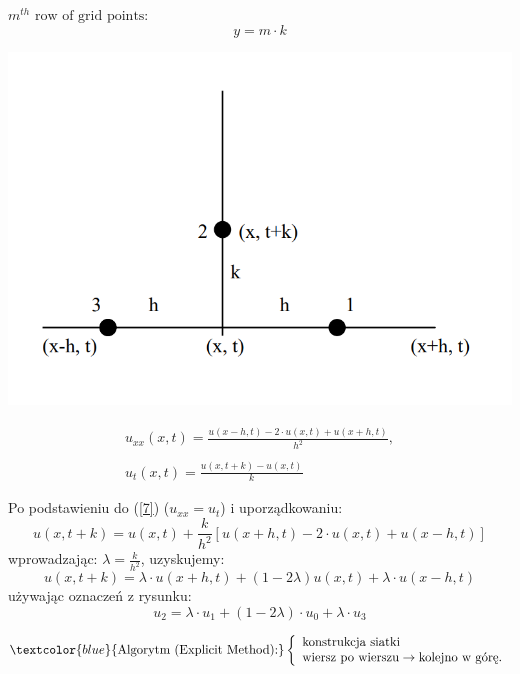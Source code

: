 \begin{frame}
$ m^{th} \text{ row of grid points:}$
$$y = m \cdot k$$
\centerline{\includegraphics[height = 0.55 \textheight]{img/23/stabilnosc2}}

\begin{block}{}
   $$ \begin{array}{l}
   u_{xx}(x,t) = \frac{u(x-h,t)-2 \cdot u(x,t) + u(x+h,t)}{h^{2}}, \\ \\
   u_t (x,t)= \frac{u(x,t+k)-u(x,t)}{k}
   \end{array}$$
 \end{block}

\end{frame}

\begin{frame}
Po podstawieniu do (\ref{7}) ($u_{x x} = u_t$) i uporządkowaniu:
$$u(x,t+k) = u(x,t) + \frac{k}{h^2}[u(x+h,t)-2\cdot u(x,t)+u(x-h,t)]$$
wprowadzając: $\lambda = \frac{k}{h^2}$, uzyskujemy:
$$u(x,t+k) = \lambda \cdot u(x+h,t)+(1-2\lambda)u(x,t)+\lambda \cdot u(x-h,t)$$
używając oznaczeń z rysunku:
$$u_2 = \lambda \cdot u_1+(1-2\lambda)\cdot u_0+\lambda \cdot u_3$$


$$ \textcolor{blue}{\text{Algorytm (Explicit Method):}}\left
\{ \begin{array}{lrl}
       \text{konstrukcja siatki}\\
       \text{wiersz po wierszu} \rightarrow \text{kolejno w górę.}
        \end{array} \right. $$
\end{frame}

